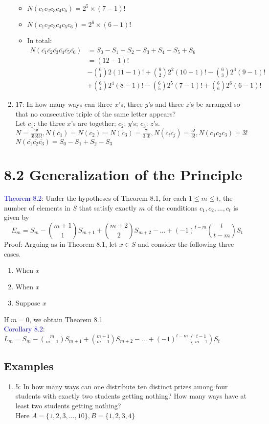\documentclass[a4paper]{article}
\begin{document}
\begin{enumerate}
\begin{itemize}
        \item $N(c_1c_2c_3c_4c_5)=2^5 \times (7-1)!$
        \item $N(c_1c_2c_3c_4c_5c_6)=2^6 \times (6-1)!$
        \item In total:\\
        \begin{align*}
            N(\bar{c_1}\bar{c_2}\bar{c_3}\bar{c_4}\bar{c_5}\bar{c_6})&=S_0-S_1+S_2-S_3+S_4-S_5+S_6\\
            &=(12-1)!\\
            &-\binom{6}{1}2(11-1)!+\binom{6}{2}2^2(10-1)!-\binom{6}{3}2^3(9-1)!\\
            &+\binom{6}{4}2^4(8-1)!-\binom{6}{5}2^5(7-1)!+\binom{6}{6}2^6(6-1)!
        \end{align*}
    \end{itemize}
    \item 17: In how many ways can three $x$’s, three $y$’s and three $z$’s be arranged so that no consecutive triple of the same letter appears?\\
    Let $c_1$: the three $x$'s are together; $c_2$: $y$'s; $c_3$: $z$'s.\\
    $N=\frac{9!}{3!3!3!},N(c_1)=N(c_2)=N(c_3)=\frac{7!}{3!3!},N(c_ic_j)=\frac{5!}{3!},N(c_1c_2c_3)=3!$\\
    $N(\bar{c_1}\bar{c_2}\bar{c_3})=S_0-S_1+S_2-S_3$
\end{enumerate}
\section*{8.2 Generalization of the Principle}
\textcolor{blue}{Theorem 8.2}: Under the hypotheses of Theorem 8.1, for each $1\leq m\leq t$, the number of elements in $S$ that satisfy exactly $m$ of the conditions $c_1, c_2, \dots, c_t$ is given by
$$
E_m=S_m-\binom{m+1}{1}S_{m+1}+\binom{m+2}{2}S_{m+2}-\dots +(-1)^{t-m}\binom{t}{t-m}S_t
$$
Proof: Arguing as in Theorem 8.1, let $x\in S$ and consider the following three cases.
\begin{enumerate}
    \item When $x$
    \item When $x$
    \item Suppose $x$
\end{enumerate}

If $m=0$, we obtain Theorem 8.1\\
\textcolor{blue}{Corollary 8.2}:  $L_m=S_m-\binom{m}{m-1}S_{m+1}+\binom{m+1}{m-1}S_{m+2}-\dots +(-1)^{t-m}\binom{t-1}{m-1}S_t$
\subsection*{Examples}
\begin{enumerate}
    \item 5: In how many ways can one distribute ten distinct prizes among four students with exactly two students getting nothing? How many ways have at least two students getting nothing?\\
    Here $A=\{1,2,3,\ldots, 10\},B=\{1,2,3,4\}$
\end{enumerate}
\end{document}
